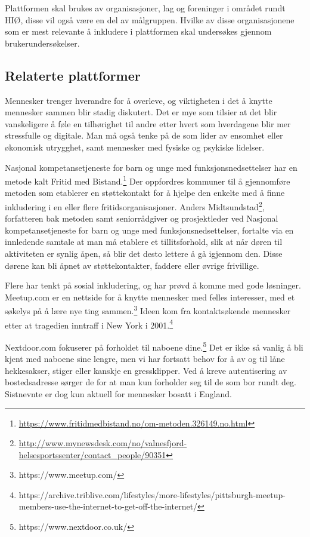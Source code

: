 Plattformen skal brukes av organisasjoner, lag og foreninger i området rundt HIØ, disse vil også være en del av målgruppen. Hvilke av disse organisasjonene som er mest relevante å inkludere i plattformen skal undersøkes gjennom brukerundersøkelser.

\subsection{Relaterte plattformer}
Mennesker trenger hverandre for å overleve, og viktigheten i det å knytte mennesker sammen blir stadig diskutert. Det er mye som tilsier at det blir vanskeligere å føle en tilhørighet til andre etter hvert som hverdagene blir mer stressfulle og digitale. Man må også tenke på de som lider av ensomhet eller økonomisk utrygghet, samt mennesker med fysiske og psykiske lidelser.

\vspace{5mm} %
Nasjonal kompetansetjeneste for barn og unge med funksjonsnedsettelser har en metode kalt Fritid med Bistand.\footnote{\url{https://www.fritidmedbistand.no/om-metoden.326149.no.html}} Der oppfordres kommuner til å gjennomføre metoden som etablerer en støttekontakt for å hjelpe den enkelte med å finne inkludering i en eller flere fritidsorganisasjoner. Anders Midtsundstad\footnote{\url{http://www.mynewsdesk.com/no/valnesfjord-helsesportssenter/contact_people/90351}},  
 forfatteren bak metoden samt seniorrådgiver og prosjektleder ved Nasjonal kompetansetjeneste for barn og unge med funksjonsnedsettelser, fortalte via en innledende samtale at man må etablere et tillitsforhold, slik at når døren til aktiviteten er synlig åpen, så blir det desto lettere å gå igjennom den. Disse dørene kan bli åpnet av støttekontakter, faddere eller øvrige frivillige. 

\vspace{5mm} %
Flere har tenkt på sosial inkludering, og har prøvd å komme med gode løsninger. Meetup.com er en nettside for å knytte mennesker med felles interesser, med et søkelys på å lære nye ting sammen.\footnote{https://www.meetup.com/} Ideen kom fra kontaktsøkende mennesker etter at tragedien inntraff i New York i 2001.\footnote{https://archive.triblive.com/lifestyles/more-lifestyles/pittsburgh-meetup-members-use-the-internet-to-get-off-the-internet/}

Nextdoor.com fokuserer på forholdet til naboene dine.\footnote{https://www.nextdoor.co.uk/} Det er ikke så vanlig å bli kjent med naboene sine lengre, men vi har fortsatt behov for å av og til låne hekkesakser, stiger eller kanskje en gressklipper. Ved å kreve autentisering av bostedsadresse sørger de for at man kun forholder seg til de som bor rundt deg. Sistnevnte er dog kun aktuell for mennesker bosatt i England.

